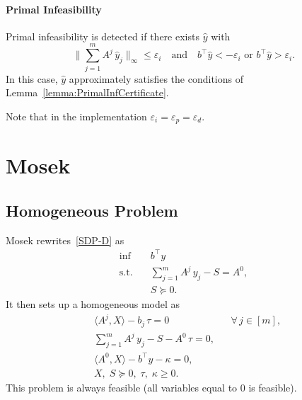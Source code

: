 \documentclass[10pt, a4paper]{article}
\newcommand{\skal}[2]{\langle{#1},{#2}\rangle}
\newcommand{\T}{^{\top}}
\begin{document}
\paragraph{Primal Infeasibility}

Primal infeasibility is detected if there exists $\hat{y}$ with
\[
\Big\lVert \sum_{j=1}^m A^j\, \hat{y}_j \Big\rVert_{\infty} \leq \varepsilon_i
\quad\text{and}\quad b\T \hat{y} < -\varepsilon_i \text{ or } b\T \hat{y} > \varepsilon_i.
\]
In this case, $\hat{y}$ approximately satisfies the conditions of
Lemma~\ref{lemma:PrimalInfCertificate}.

 Note that in the implementation $\varepsilon_i = \varepsilon_p = \varepsilon_d$.

\section{Mosek}


\subsection{Homogeneous Problem}

Mosek rewrites~\eqref{SDP-D} as
\begin{equation}\label{SDP-D2}
  \begin{aligned}
    \inf \quad & b\T y \\
    \text{s.t.} \quad & \sum_{j=1}^m A^j\, y_j - S = A^0, \\
    & S \succeq 0.
  \end{aligned}
\end{equation}
It then sets up a homogeneous model as
\begin{equation}\label{HOM}
  \begin{aligned}
    & \skal{A^j}{X} - b_j\,\tau = 0 && \forall \, j \in [m],\\
    & \sum_{j=1}^m A^j\, y_j - S - A^0\, \tau = 0, \\
    & \skal{A^0}{X} - b\T y - \kappa = 0,\\
    & X,\; S \succeq 0,\; \tau,\; \kappa \geq 0.
  \end{aligned}
\end{equation}
This problem is always feasible (all variables equal to 0 is feasible).
\end{document}
